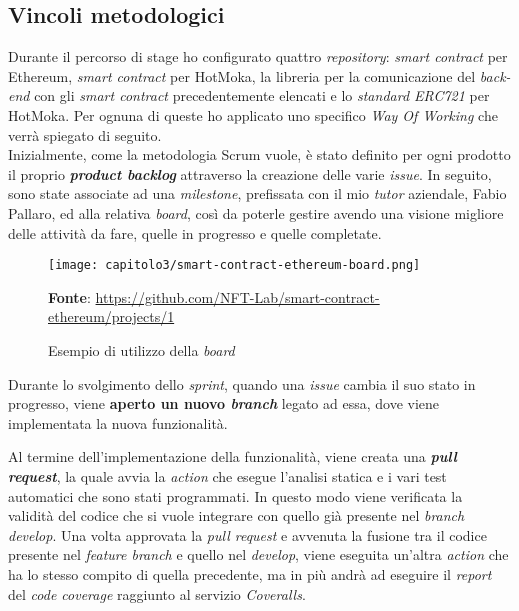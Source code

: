 
\subsection{Vincoli metodologici}
Durante il percorso di stage ho configurato quattro \textit{repository}: \textit{smart contract} per Ethereum, \textit{smart contract} per HotMoka, la libreria per la comunicazione del \textit{back-end} con gli \textit{smart contract} precedentemente elencati e lo \textit{standard ERC721} per HotMoka. Per ognuna di queste ho applicato uno specifico \textit{Way Of Working} che verrà spiegato di seguito. \\

Inizialmente, come la metodologia Scrum vuole, è stato definito per ogni prodotto il proprio \textbf{\textit{product backlog}} attraverso la creazione delle varie \textit{issue}. In seguito, sono state associate ad una \textit{milestone}, prefissata con il mio \textit{tutor} aziendale, Fabio Pallaro, ed alla relativa \textit{board}, così da poterle gestire avendo una visione migliore delle attività da fare, quelle in progresso e quelle completate.

\clearpage
\begin{figure}[h!]
  \centering
  \texttt{[image: capitolo3/smart-contract-ethereum-board.png]}
  \caption{Esempio di utilizzo della \textit{board}}
  \textbf{Fonte}: \href{https://github.com/NFT-Lab/smart-contract-ethereum/projects/1}{https://github.com/NFT-Lab/smart-contract-ethereum/projects/1}
\end{figure}

Durante lo svolgimento dello \textit{sprint}, quando una \textit{issue} cambia il suo stato in progresso, viene \textbf{aperto un nuovo \textit{branch}} legato ad essa, dove viene implementata la nuova funzionalità.

Al termine dell'implementazione della funzionalità, viene creata una \textbf{\textit{pull request}}, la quale avvia la \textit{action} che esegue l'analisi statica e i vari test automatici che sono stati programmati. In questo modo viene verificata la validità del codice che si vuole integrare con quello già presente nel \textit{branch develop}. Una volta approvata la \textit{pull request} e avvenuta la fusione tra il codice presente nel \textit{feature branch} e quello nel \textit{develop}, viene eseguita un'altra \textit{action} che ha lo stesso compito di quella precedente, ma in più andrà ad eseguire il \textit{report} del \textit{code coverage} raggiunto al servizio \textit{Coveralls}.

